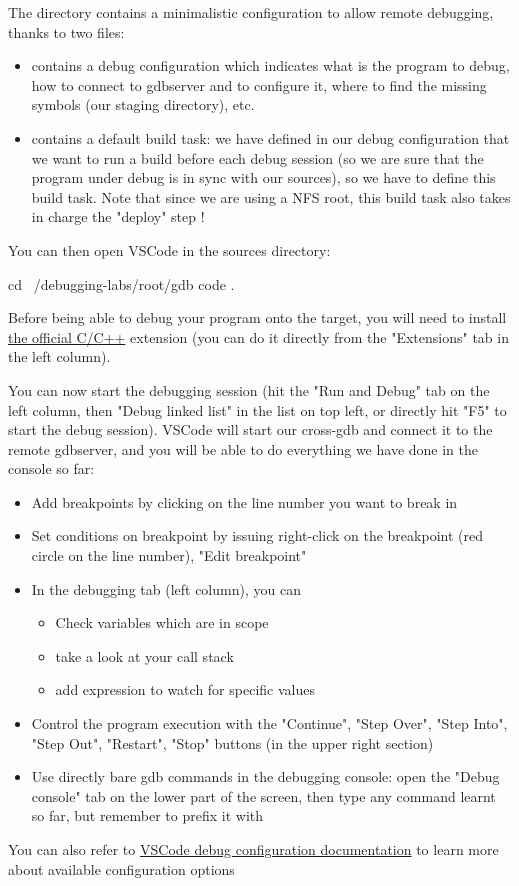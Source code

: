 The  directory contains a minimalistic configuration to allow
remote debugging, thanks to two files:
\begin{itemize}
  \item {} contains a debug configuration which indicates what
  is the program to debug, how to connect to gdbserver and to configure it, where to
  find the missing symbols (our staging directory), etc.
  \item {} contains a default build task: we have defined in our
  debug configuration that we want to run a build before each debug session (so
  we are sure that the program under debug is in sync with our sources), so
  we have to define this build task. Note that since we are using a NFS root,
  this build task also takes in charge the "deploy" step !
\end{itemize}

You can then open VSCode in the sources directory:
\begin{bashinput}
  cd ~/debugging-labs/root/gdb
  code .
\end{bashinput}
Before being able to debug your program onto the target, you will need to install
\href{https://marketplace.visualstudio.com/items?itemName=ms-vscode.cpptools}{the
official C/C++} extension (you can do it directly from the "Extensions" tab in
the left column).

You can now start the debugging session (hit the "Run and Debug"
tab on the left column, then "Debug linked list" in the list on top left, or
directly hit "F5" to start the debug session).
VSCode will start our cross-gdb and connect it to the remote gdbserver, and you
will be able to do everything we have done in the console so far:
\begin{itemize}
  \item Add breakpoints by clicking on the line number you want to break in
  \item Set conditions on breakpoint by issuing right-click on the breakpoint
  (red circle on the line number), "Edit breakpoint"
  \item In the debugging tab (left column), you can
  \begin{itemize}
    \item Check variables which are in scope
    \item take a look at your call stack
    \item add expression to watch for specific values
  \end{itemize}
  \item Control the program execution with the "Continue", "Step Over", "Step
  Into", "Step Out", "Restart", "Stop" buttons (in the upper right section)
  \item Use directly bare gdb commands in the debugging console: open the
  "Debug console" tab on the lower part of the screen, then type any command
  learnt so far, but remember to prefix it with 
\end{itemize}

You can also refer to
\href{https://code.visualstudio.com/docs/editor/debugging}{VSCode debug
configuration documentation} to learn more about available configuration options
